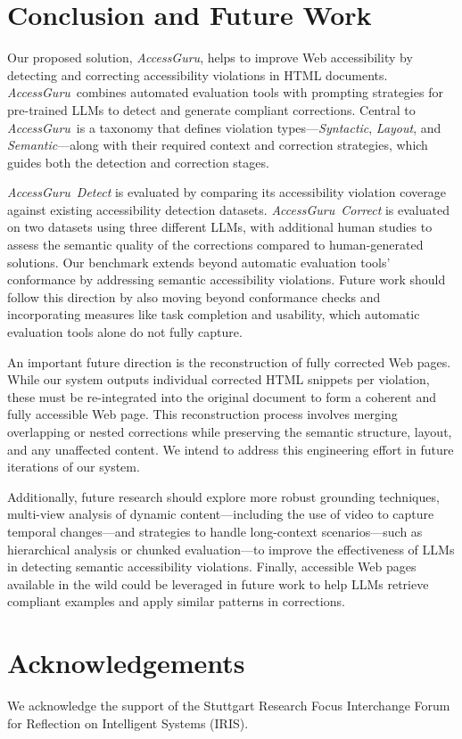 \documentclass[sigconf, nonacm]{acmart}
\newcommand{\method}{\emph{AccessGuru}}
\begin{document}
\section{Conclusion and Future Work}
Our proposed solution, \method, helps to improve Web accessibility by detecting and correcting accessibility violations in HTML documents. \method\ combines automated evaluation tools with prompting strategies for pre-trained LLMs to detect and generate compliant corrections. Central to \method\ is a taxonomy that defines violation types—\emph{Syntactic}, \emph{Layout}, and \emph{Semantic}—along with their required context and correction strategies, which guides both the detection and correction stages. 

\method\ \emph{Detect} is evaluated by comparing its accessibility violation coverage against existing accessibility detection datasets. \method\ \emph{Correct} is evaluated on two datasets using three different LLMs, with additional human studies to assess the semantic quality of the corrections compared to human-generated solutions. Our benchmark extends beyond automatic evaluation tools' conformance by addressing semantic accessibility violations. Future work should follow this direction by also moving beyond conformance checks and incorporating measures like task completion and usability, which automatic evaluation tools alone do not fully capture.


An important future direction is the reconstruction of fully corrected Web pages. While our system outputs individual corrected HTML snippets per violation, these must be re-integrated into the original document to form a coherent and fully accessible Web page. This reconstruction process involves merging overlapping or nested corrections while preserving the semantic structure, layout, and any unaffected content. We intend to address this engineering effort in future iterations of our system.

Additionally, future research should explore more robust grounding techniques, multi-view analysis of dynamic content—including the use of video to capture temporal changes—and strategies to handle long-context scenarios—such as hierarchical analysis or chunked evaluation—to improve the effectiveness of LLMs in detecting semantic accessibility violations. Finally, accessible Web pages available in the wild could be leveraged in future work to help LLMs retrieve compliant examples and apply similar patterns in corrections.

\section{Acknowledgements}
We acknowledge the support of the Stuttgart Research Focus Interchange Forum for Reflection on Intelligent Systems (IRIS).


\appendix
\end{document}
